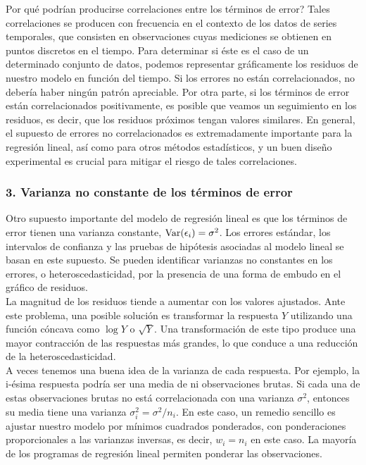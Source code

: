 Por qué podrían producirse correlaciones entre los términos de error? Tales correlaciones se producen con frecuencia en el contexto de los datos de series temporales, que consisten en observaciones cuyas mediciones se obtienen en puntos discretos en el tiempo. Para determinar si éste es el caso de un determinado conjunto de datos, podemos representar gráficamente los residuos de nuestro modelo en función del tiempo. Si los errores no están correlacionados, no debería haber ningún patrón apreciable. Por otra parte, si los términos de error están correlacionados positivamente, es posible que veamos un seguimiento en los residuos, es decir, que los residuos próximos tengan valores similares.  En general, el supuesto de errores no correlacionados es extremadamente importante para la regresión lineal, así como para otros métodos estadísticos, y un buen diseño experimental es crucial para mitigar el riesgo de tales correlaciones.

\subsubsection{3. Varianza no constante de los términos de error}
Otro supuesto importante del modelo de regresión lineal es que los términos de error tienen una varianza constante, $\mathop{\mbox{\normalfont Var}}\nolimits(\epsilon_i) = \sigma^2$. Los errores estándar, los intervalos de confianza y las pruebas de hipótesis asociadas al modelo lineal se basan en este supuesto. Se pueden identificar varianzas no constantes en los errores, o heteroscedasticidad, por la presencia de una forma de embudo en el gráfico de residuos.\\

La magnitud de los residuos tiende a aumentar con los valores ajustados. Ante este problema, una posible solución es transformar la respuesta $Y$ utilizando una función cóncava como $\log Y$ o $\sqrt{Y}$. Una transformación de este tipo produce una mayor contracción de las respuestas más grandes, lo que conduce a una reducción de la heteroscedasticidad.\\

A veces tenemos una buena idea de la varianza de cada respuesta. Por ejemplo, la i-ésima respuesta podría ser una media de ni observaciones brutas. Si cada una de estas observaciones brutas no está correlacionada con una varianza $\sigma^2$, entonces su media tiene una varianza $\sigma_i^2 = \sigma^2/n_i$. En este caso, un remedio sencillo es ajustar nuestro modelo por mínimos cuadrados ponderados, con ponderaciones proporcionales a las varianzas inversas, es decir, $w_i = n_i$ en este caso. La mayoría de los programas de regresión lineal permiten ponderar las observaciones.\\

